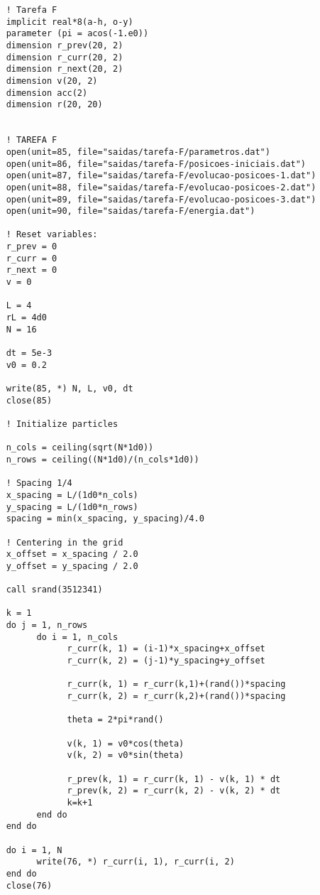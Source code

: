 \begin{verbatim}
    ! Tarefa F 
    implicit real*8(a-h, o-y)
    parameter (pi = acos(-1.e0))
    dimension r_prev(20, 2)
    dimension r_curr(20, 2)
    dimension r_next(20, 2)
    dimension v(20, 2)
    dimension acc(2)
    dimension r(20, 20)


    ! TAREFA F 
    open(unit=85, file="saidas/tarefa-F/parametros.dat")
    open(unit=86, file="saidas/tarefa-F/posicoes-iniciais.dat")
    open(unit=87, file="saidas/tarefa-F/evolucao-posicoes-1.dat")
    open(unit=88, file="saidas/tarefa-F/evolucao-posicoes-2.dat")
    open(unit=89, file="saidas/tarefa-F/evolucao-posicoes-3.dat")
    open(unit=90, file="saidas/tarefa-F/energia.dat")

    ! Reset variables: 
    r_prev = 0
    r_curr = 0
    r_next = 0
    v = 0

    L = 4
    rL = 4d0
    N = 16

    dt = 5e-3
    v0 = 0.2

    write(85, *) N, L, v0, dt 
    close(85)

    ! Initialize particles 

    n_cols = ceiling(sqrt(N*1d0))
    n_rows = ceiling((N*1d0)/(n_cols*1d0)) 
    
    ! Spacing 1/4 
    x_spacing = L/(1d0*n_cols)
    y_spacing = L/(1d0*n_rows)
    spacing = min(x_spacing, y_spacing)/4.0 
    
    ! Centering in the grid
    x_offset = x_spacing / 2.0 
    y_offset = y_spacing / 2.0
    
    call srand(3512341)

    k = 1 
    do j = 1, n_rows 
          do i = 1, n_cols 
                r_curr(k, 1) = (i-1)*x_spacing+x_offset
                r_curr(k, 2) = (j-1)*y_spacing+y_offset
                
                r_curr(k, 1) = r_curr(k,1)+(rand())*spacing
                r_curr(k, 2) = r_curr(k,2)+(rand())*spacing
                
                theta = 2*pi*rand()
                
                v(k, 1) = v0*cos(theta)
                v(k, 2) = v0*sin(theta)
                
                r_prev(k, 1) = r_curr(k, 1) - v(k, 1) * dt 
                r_prev(k, 2) = r_curr(k, 2) - v(k, 2) * dt 
                k=k+1
          end do 
    end do

    do i = 1, N 
          write(76, *) r_curr(i, 1), r_curr(i, 2)
    end do 
    close(76)


\end{verbatim}
